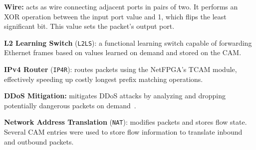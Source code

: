 \textbf{Wire:} acts as wire connecting adjacent ports in pairs of two. It performs an XOR operation between the input port value and 1, which flips the least significant bit. This value sets the packet's output port.

\textbf{L2 Learning Switch} (\texttt{L2LS}): a functional learning switch capable of forwarding Ethernet frames based on values learned on demand and stored on the CAM.


\textbf{IPv4 Router} (\texttt{IP4R}): routes packets using the NetFPGA's TCAM module, effectively speeding up costly longest prefix matching operations. 

\textbf{DDoS Mitigation:} mitigates DDoS attacks by analyzing and dropping potentially dangerous packets on demand~\cite{Bertin2017}.

\textbf{Network Address Translation} (\texttt{NAT}): modifies packets and stores flow state. Several CAM entries were used to store flow information to translate inbound and outbound packets.



